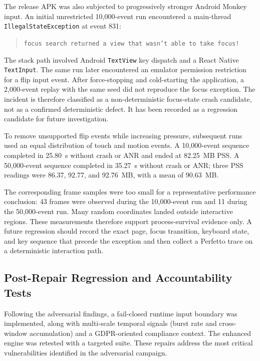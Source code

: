The release APK was also subjected to progressively stronger Android Monkey input. An initial unrestricted 10,000-event run encountered a main-thread
\texttt{IllegalStateException} at event 831:

\begin{quote}
\texttt{focus search returned a view that wasn't able to take focus!}
\end{quote}

The stack path involved Android \texttt{TextView} key dispatch and a React Native \texttt{TextInput}. The same run later encountered an emulator permission restriction for a flip input event. After force-stopping and cold-starting the application, a 2,000-event replay with the same seed did not reproduce the focus exception. The incident is therefore classified as a non-deterministic focus-state crash candidate, not as a confirmed deterministic defect. It has been recorded as a regression candidate for future investigation.

To remove unsupported flip events while increasing pressure, subsequent runs used an equal distribution of touch and motion events. A 10,000-event sequence completed in 25.80~s without crash or ANR and ended at 82.25~MB PSS. A 50,000-event sequence completed in 35.27~s without crash or ANR; three PSS readings were 86.37, 92.77, and 92.76~MB, with a mean of 90.63~MB.

The corresponding frame samples were too small for a representative performance conclusion: 43 frames were observed during the 10,000-event run and 11 during the 50,000-event run. Many random coordinates landed outside interactive regions. These measurements therefore support process-survival evidence only. A future regression should record the exact page, focus transition, keyboard state, and key sequence that precede the exception and then collect a Perfetto trace on a deterministic interaction path.

\subsection{Post-Repair Regression and Accountability Tests}

Following the adversarial findings, a fail-closed runtime input boundary was implemented, along with multi-scale temporal signals (burst rate and cross-window accumulation) and a GDPR-oriented compliance context. The enhanced engine was retested with a targeted suite. These repairs address the most critical vulnerabilities identified in the adversarial campaign.

